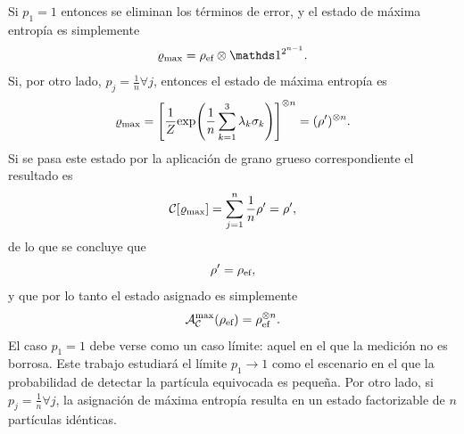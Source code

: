 Si $p_{1}=1$ entonces se eliminan los términos de error, y el estado de máxima entropía es simplemente
\begin{equation}
    \varrho_{\max}=\rho_{\ef}\otimes\Id^{2^{n-1}}.\nonumber
\end{equation}
Si, por otro lado, $p_{j}=\frac{1}{n}\forall j$, entonces el estado de máxima entropía es
\begin{equation}
    \varrho_{\max}=\qty[\frac{1}{Z}\text{exp}\qty(\frac{1}{n}\sum_{k=1}^{3}\lambda_{k}\sigma_{k})]^{\otimes n}=(\rho')^{\otimes n}.\nonumber
\end{equation}
Si se pasa este estado por la aplicación de grano grueso correspondiente el resultado es 
\begin{equation}
    \mathcal{C}[\varrho_{\max}]=\sum_{j=1}^{n}\frac{1}{n}\rho'=\rho',\nonumber
\end{equation}
de  lo que se concluye que
\begin{equation*}
    \rho'=\rho_{\text{ef}},
\end{equation*}
y que por lo tanto el estado asignado es simplemente
\begin{equation}
    \mathcal{A}_{\mathcal{C}}^{\max}(\rho_{\text{ef}})=\rho_{\text{ef}}^{\otimes n}.\nonumber
\end{equation}
El caso $p_{1}=1$ debe verse como un caso límite: aquel en el que la medición no es borrosa. Este trabajo estudiará el límite $p_{1}\rightarrow 1$ como el escenario en el que la probabilidad de detectar la partícula equivocada es pequeña. Por otro lado, si $p_{j}=\frac{1}{n}\forall j$, la asignación de máxima entropía resulta en un estado factorizable de $n$ partículas idénticas.